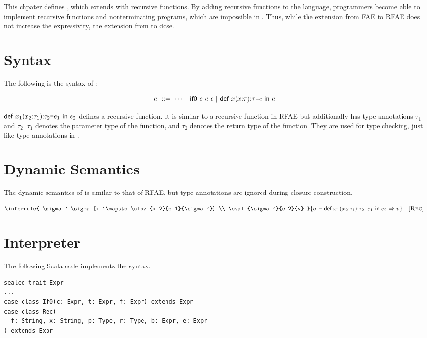 This chpater defines \lang, which extends \plang with recursive functions. By
adding recursive functions to the language, programmers become able to implement
recursive functions and nonterminating programs, which are impossible in \plang.
Thus, while the extension from \textsf{FAE} to \textsf{RFAE} does not increase
the expressivity, the extension from \plang to \lang dose.

\section{Syntax}

The following is the syntax of \lang:

\[
e\ ::=\ \cdots
\ | \ \textsf{if0}\ e\ e\ e
\ | \ \textsf{def}\ x(x{:}\tau){:}\tau\texttt{=} e\ \textsf{in}\ e
\]

$\textsf{def}\ x_1(x_2{:}\tau_1){:}\tau_2\texttt{=} e_1\ \textsf{in}\ e_2$ defines a recursive
function. It is similar to a recursive function in \textsf{RFAE} but
additionally has
type annotations $\tau_1$ and $\tau_2$. $\tau_1$ denotes the parameter type of the
function, and $\tau_2$ denotes the return type of the function. They are
used for type checking, just like type annotations in \plang.

\section{Dynamic Semantics}

The dynamic semantics of \lang is similar to that of \textsf{RFAE}, but type
annotations are ignored during closure construction.


\vspace{-1em}

\[
  \inferrule
  {
    \sigma'=\sigma[x_1\mapsto\clov{x_2}{e_1}{\sigma'}] \\
    \eval{\sigma'}{e_2}{v}
  }
  { \evald{\erect{x_1}{x_2}{\tau_1}{\tau_2}{e_1}{e_2}}{v} }
  \quad\textsc{[Rec]}
\]

\section{Interpreter}

The following Scala code implements the syntax:

\begin{verbatim}
sealed trait Expr
...
case class If0(c: Expr, t: Expr, f: Expr) extends Expr
case class Rec(
  f: String, x: String, p: Type, r: Type, b: Expr, e: Expr
) extends Expr
\end{verbatim}

